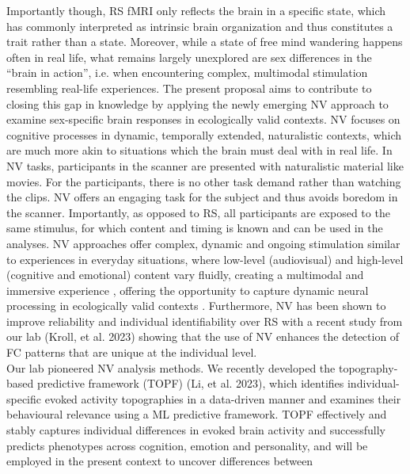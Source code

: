 \documentclass[11pt,a4paper]{article}
\begin{document}
\par\vspace{-1\parskip}\noindent
Importantly though, RS fMRI only reflects the brain in a specific state, which has commonly interpreted as 
intrinsic brain organization and thus constitutes a trait rather than a state. Moreover, while a state of free mind wandering happens often in real life, what remains largely unexplored are sex differences in the “brain in action”, i.e. when encountering complex, multimodal stimulation resembling real-life experiences.
The present proposal aims to contribute to closing this gap in knowledge by applying the newly 
emerging NV approach to examine sex-specific brain responses in ecologically valid contexts. NV focuses on 
cognitive processes in dynamic, temporally extended, naturalistic contexts, which are much more akin to
situations which the brain must deal with in real life. In NV tasks, participants in the scanner are 
presented with naturalistic material like movies. For the participants, there is no other task demand rather 
than watching the clips. NV offers an engaging task for the subject and thus avoids boredom in the scanner. 
Importantly, as opposed to RS, all participants are exposed to the same stimulus, for which content and timing 
is known and can be used in the analyses. NV approaches offer complex, dynamic and ongoing stimulation similar 
to experiences in everyday situations, where low-level (audiovisual) and high-level (cognitive and emotional) 
content vary fluidly, creating a multimodal and immersive experience \parencite{sonkusareNaturalisticStimuliNeuroscience2019}, offering the 
opportunity to capture dynamic neural processing in ecologically valid contexts \parencite{vanderwalMoviesMagnetNaturalistic2019}. 
Furthermore, NV has been shown to improve reliability and individual identifiability over RS \parencite{krollNaturalisticViewingIncreases2023} 
with a recent study from our lab (Kroll, et al. 2023) showing that the use of NV enhances the detection of 
FC patterns that are unique at the individual level.\\ 
Our lab pioneered NV analysis methods. We recently developed the topography-based predictive framework 
(TOPF) (Li, et al. 2023), which identifies individual-specific evoked activity topographies in a data-driven 
manner and examines their behavioural relevance using a ML predictive framework. 
TOPF effectively and stably captures individual differences in evoked brain activity and successfully predicts phenotypes across 
cognition, emotion and personality, and will be employed in the present context to uncover differences between 
\end{document}
